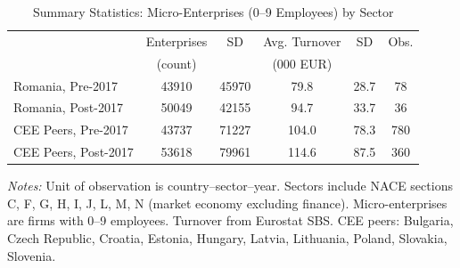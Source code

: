 \begin{table}[t]
\centering
\caption{Summary Statistics: Micro-Enterprises (0--9 Employees) by Sector}
\label{tab:summary}
\small
\begin{tabular}{lccccc}
\toprule
 & Enterprises & SD & Avg. Turnover & SD & Obs. \\
 & (count) & & (000 EUR) & & \\
\midrule
Romania, Pre-2017 & 43910 & 45970 & 79.8 & 28.7 & 78 \\
Romania, Post-2017 & 50049 & 42155 & 94.7 & 33.7 & 36 \\
\midrule
CEE Peers, Pre-2017 & 43737 & 71227 & 104.0 & 78.3 & 780 \\
CEE Peers, Post-2017 & 53618 & 79961 & 114.6 & 87.5 & 360 \\
\bottomrule
\end{tabular}
\begin{tablenotes}
\item \textit{Notes:} Unit of observation is country--sector--year. 
Sectors include NACE sections C, F, G, H, I, J, L, M, N (market economy excluding finance). 
Micro-enterprises are firms with 0--9 employees. Turnover from Eurostat SBS. 
CEE peers: Bulgaria, Czech Republic, Croatia, Estonia, Hungary, Latvia, Lithuania, Poland, Slovakia, Slovenia.
\end{tablenotes}
\end{table}
